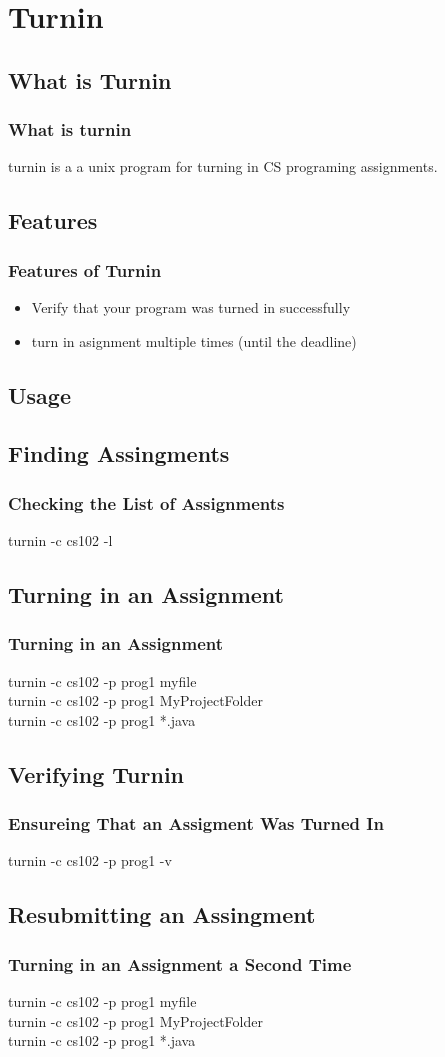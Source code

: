 \documentclass[hyperref={pdfpagelabels=false}]{beamer}
\begin{document}
\section{Turnin}
\subsection{What is Turnin}
\frame
{
    \frametitle{What is turnin}
    turnin is a a unix program for turning in CS programing assignments.
}

\subsection{Features}
\frame
{
    \frametitle{Features of Turnin}
    \begin{itemize}
    \item{Verify that your program was turned in successfully}
    \item{turn in asignment multiple times (until the deadline)}
    \end{itemize}
}
\subsection{Usage}
\subsection{Finding Assingments}
\frame
{
    \frametitle{Checking the List of Assignments}
	turnin -c cs102 -l
}
\subsection{Turning in an Assignment}
\frame
{
    \frametitle{Turning in an Assignment}
	turnin -c cs102 -p prog1 myfile\\
	turnin -c cs102 -p prog1 MyProjectFolder\\
	turnin -c cs102 -p prog1 *.java
}
\subsection{Verifying Turnin}
\frame
{
    \frametitle{Ensureing That an Assigment Was Turned In}
	turnin -c cs102 -p prog1 -v

}
\subsection{Resubmitting an Assingment}
\frame
{
    \frametitle{Turning in an Assignment a Second Time}
	turnin -c cs102 -p prog1 myfile\\
	turnin -c cs102 -p prog1 MyProjectFolder\\
	turnin -c cs102 -p prog1 *.java\\
	
}
\end{document}
